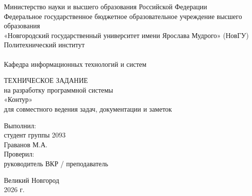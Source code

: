\begin{titlepage}
\begin{center}

Министерство науки и высшего образования Российской Федерации
\\
Федеральное государственное бюджетное образовательное учреждение
высшего образования
\\
«Новгородский государственный университет имени Ярослава Мудрого» (НовГУ)
\\
Политехнический институт
\\
\tiny\underline{\hspace{16cm}}
\\
\normalsize \lsstyle Кафедра информационных технологий и систем
\\
\end{center}

\vspace*{25mm}

\begin{center}
ТЕХНИЧЕСКОЕ ЗАДАНИЕ
\\
на разработку программной системы
\\
«Контур»
\\
для совместного ведения задач, документации и заметок
\\
\end{center}

\vspace*{20mm}

\begin{flushright}
\begin{minipage}[t]{0.52\textwidth}
Выполнил:
\\
студент группы 2093
\\
Граванов М.А.
\\
Проверил:
\\
руководитель ВКР / преподаватель
\\
\underline{\hspace{55mm}}
\end{minipage}
\end{flushright}

\vfill

\begin{center}
Великий Новгород
\\
2026 г.
\end{center}
\end{titlepage}
\restoregeometry
\addtocounter{page}{1}
